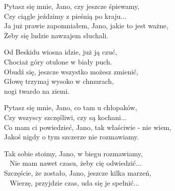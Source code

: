 \begin{text}
Pytasz się mnie, Jano, czy jeszcze śpiewamy, \\
Czy ciągle jeździmy z pieśnią po kraju... \\
Ja już prawie zapomniałem, Jano, jakie to jest ważne, \\
Żeby się ludzie nawzajem słuchali.

\vin Od Beskidu wiosna idzie, już ją czuć, \\
\vin Chociaż góry otulone w biały puch. \\
\vin Obudź się, jeszcze wszystko możesz zmienić,\\
\vin Głowę trzymaj wysoko w chmurach,\\
\vin\vin\vin\vin nogi twardo na ziemi. 

Pytasz się mnie, Jano, co tam u chłopaków, \\
Czy wszyscy szczęśliwi, czy są kochani... \\
Co mam ci powiedzieć, Jano, tak właściwie - nie wiem, \\
Jakoś nigdy o tym szczerze nie rozmawiamy. 

Tak sobie stoimy, Jano, w biegu rozmawiamy,\\ 
Nie mam nawet czasu, żeby cię odwiedzić... \\
Szczęście, że zostało, Jano, jeszcze kilka marzeń,\\ 
Wierzę, przyjdzie czas, uda się je spełnić... 
\end{text}